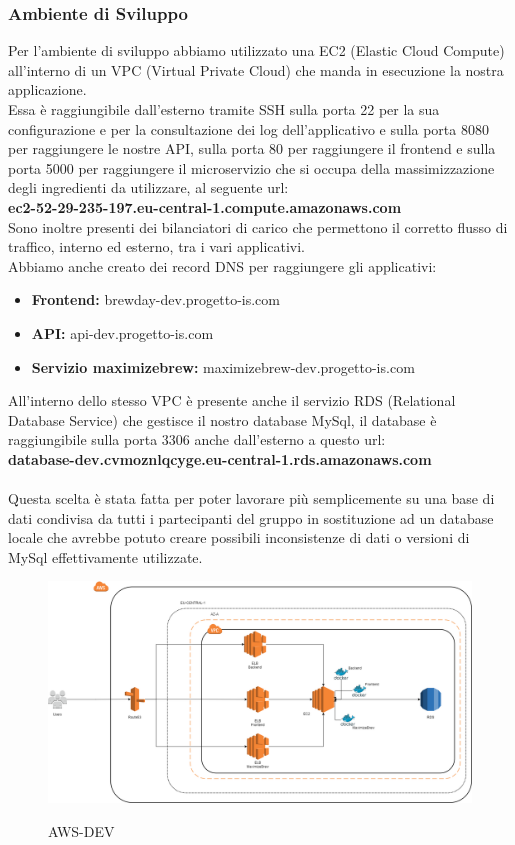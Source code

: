 \documentclass{article}
\begin{document}
\subsubsection{Ambiente di Sviluppo}
Per l’ambiente di sviluppo abbiamo utilizzato una EC2 (Elastic Cloud Compute) all’interno di un VPC (Virtual Private Cloud) che manda in esecuzione la nostra applicazione.\\
Essa è raggiungibile dall’esterno tramite SSH sulla porta 22 per la sua configurazione e per la consultazione dei log dell’applicativo e sulla porta 8080 per raggiungere le nostre API, sulla porta 80 per raggiungere il frontend e sulla porta 5000 per raggiungere il microservizio che si occupa della massimizzazione degli ingredienti da utilizzare, al seguente url: \\ \textbf{ec2-52-29-235-197.eu-central-1.compute.amazonaws.com}\\
Sono inoltre presenti dei bilanciatori di carico che permettono il corretto flusso di traffico, interno ed esterno, tra i vari applicativi.\\
Abbiamo anche creato dei record DNS per raggiungere gli applicativi:
\begin{itemize}
    \item \textbf{Frontend:} brewday-dev.progetto-is.com
    \item \textbf{API:} api-dev.progetto-is.com
    \item \textbf{Servizio maximizebrew:} maximizebrew-dev.progetto-is.com
\end{itemize}
All’interno dello stesso VPC è presente anche il servizio RDS (Relational Database Service) che gestisce il nostro database MySql, il database è raggiungibile sulla porta 3306 anche dall’esterno a questo url:\\ \textbf{database-dev.cvmoznlqcyge.eu-central-1.rds.amazonaws.com}\\
\\
Questa scelta è stata fatta per poter lavorare più semplicemente su una base di dati condivisa da tutti i partecipanti del gruppo in sostituzione ad un database locale che avrebbe potuto creare possibili inconsistenze di dati o versioni di MySql effettivamente utilizzate.\\
\begin{figure}[h!]
\centering
\includegraphics[scale=0.2]{AWS-DEV.png}
\label{fig:AWS-DEV}
\caption{AWS-DEV}
\end{figure}
\clearpage
\end{document}

